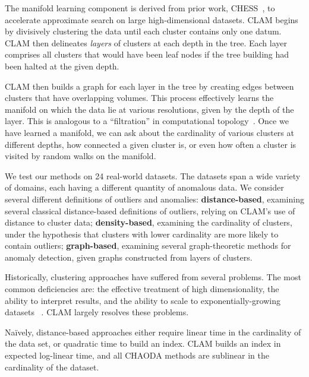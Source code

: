 The manifold learning component is derived from prior work, CHESS~\cite{ishaq2019entropy}, to accelerate approximate search on large high-dimensional datasets.
CLAM begins by divisively clustering the data until each cluster contains only one datum.
CLAM then delineates \textit{layers} of clusters at each depth in the tree.
Each layer comprises all clusters that would have been leaf nodes if the tree building had been halted at the given depth.

CLAM then builds a graph for each layer in the tree by creating edges between clusters that have overlapping volumes.
This process effectively learns the manifold on which the data lie at various resolutions, given by the depth of the layer.
This is analogous to a ``filtration'' in computational topology~\cite{carlsson2009topology}.
Once we have learned a manifold, we can ask about the cardinality of various clusters at different depths, how connected a given cluster is, or even how often a cluster is visited by random walks on the manifold.

We test our methods on 24 real-world datasets.
The datasets span a wide variety of domains, each having a different quantity of anomalous data.
We consider several different definitions of outliers and anomalies: \textbf{distance-based}, examining several classical distance-based definitions of outliers, relying on CLAM's use of distance to cluster data; \textbf{density-based}, examining the cardinality of clusters, under the hypothesis that clusters with lower cardinality are more likely to contain outliers; \textbf{graph-based}, examining several graph-theoretic methods for anomaly detection, given graphs constructed from layers of clusters.

Historically, clustering approaches have suffered from several problems.
The most common deficiencies are: the effective treatment of high dimensionality, the ability to interpret results, and the ability to scale to exponentially-growing datasets ~\cite{agrawal1998automatic}.
CLAM largely resolves these problems.

Na\"ively, distance-based approaches either require linear time in the cardinality of the data set, or quadratic time to build an index. CLAM builds an index in expected log-linear time, and all CHAODA methods are sublinear in the cardinality of the dataset.

